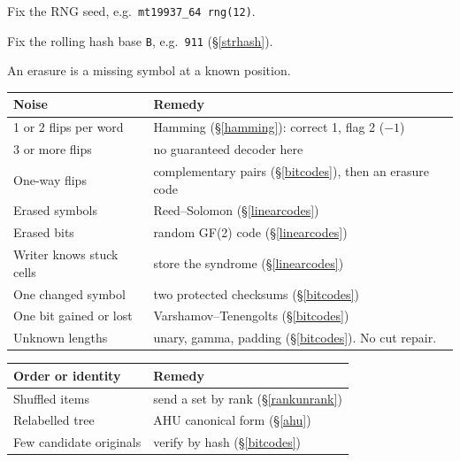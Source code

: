 \label{multipasscheck}
{\footnotesize\tightdisplay
\begin{checks}
  \item Fix the RNG seed, e.g.\ \texttt{mt19937\_64 rng(12)}.
  \item Fix the rolling hash base \texttt{B}, e.g.\ \texttt{911} (\S\ref{strhash}).
\end{checks}
}
\label{noisetaxonomy}
{\footnotesize\tightdisplay
An erasure is a missing symbol at a known position.
\par\begin{tabular}{@{}p{3.35cm}p{\dimexpr\linewidth-3.35cm-2\tabcolsep\relax}@{}}
\toprule
Noise & Remedy \\
\midrule
1 or 2 flips per word & Hamming (\S\ref{hamming}): correct 1, flag 2 ($-1$) \\
3 or more flips & no guaranteed decoder here \\
One-way flips & complementary pairs (\S\ref{bitcodes}), then an erasure code \\
Erased symbols & Reed--Solomon (\S\ref{linearcodes}) \\
Erased bits & random GF(2) code (\S\ref{linearcodes}) \\
Writer knows stuck cells & store the syndrome (\S\ref{linearcodes}) \\
One changed symbol & two protected checksums (\S\ref{bitcodes}) \\
One bit gained or lost & Varshamov--Tenengolts (\S\ref{bitcodes}) \\
Unknown lengths & \raggedright unary, gamma, padding (\S\ref{bitcodes}). No cut repair. \tabularnewline
\bottomrule
\end{tabular}\par
\begin{tabular}{@{}p{3.35cm}p{\dimexpr\linewidth-3.35cm-2\tabcolsep\relax}@{}}
\toprule
Order or identity & Remedy \\
\midrule
Shuffled items & send a set by rank (\S\ref{rankunrank}) \\
Relabelled tree & AHU canonical form (\S\ref{ahu}) \\
Few candidate originals & verify by hash (\S\ref{bitcodes}) \\
\bottomrule
\end{tabular}\par
}

